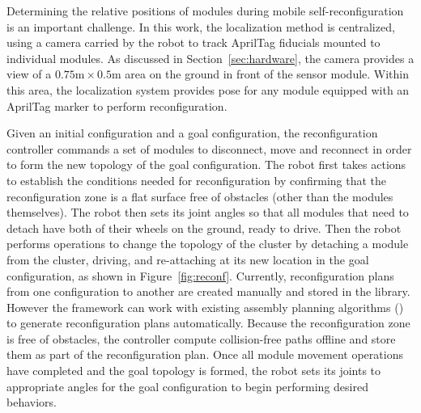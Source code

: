 \documentclass[journal]{IEEEtran}
\newcommand{\TODO}[1]{ {\bf \textcolor{red}{TODO:} #1 }}
\begin{document}
Determining the relative positions of modules during mobile self-reconfiguration is an important challenge. 
In this work, the localization method is centralized, using a camera carried by the robot to track AprilTag fiducials mounted to individual modules.
As discussed in Section~\ref{sec:hardware}, the camera provides a view of a $0.75\text{m}\times0.5\text{m}$ area on the ground in front of the sensor module.  
Within this area, the localization system provides pose for any module equipped with an AprilTag marker to perform reconfiguration. 

Given an initial configuration and a goal configuration, the reconfiguration controller commands a set of modules to disconnect, move and reconnect in order to form the new topology of the goal configuration. 
The robot first takes actions to establish the conditions needed for reconfiguration by confirming that the reconfiguration zone is a flat surface free of obstacles (other than the modules themselves).
The robot then sets its joint angles so that all modules that need to detach have both of their wheels on the ground, ready to drive.
Then the robot performs operations to change the topology of the cluster by detaching a module from the cluster, driving, and re-attaching at its new location in the goal configuration, as shown in Figure~\ref{fig:reconf}.
Currently, reconfiguration plans from one configuration to another are created manually and stored in the library. However the framework can work with existing assembly planning algorithms (\cite{Werfel2007,Seo2013}) to generate reconfiguration plans automatically.
Because the reconfiguration zone is free of obstacles, the controller compute collision-free paths offline and store them as part of the reconfiguration plan.
Once all module movement operations have completed and the goal topology is formed, the robot sets its joints to appropriate angles for the goal configuration to begin performing desired behaviors.
\end{document}
